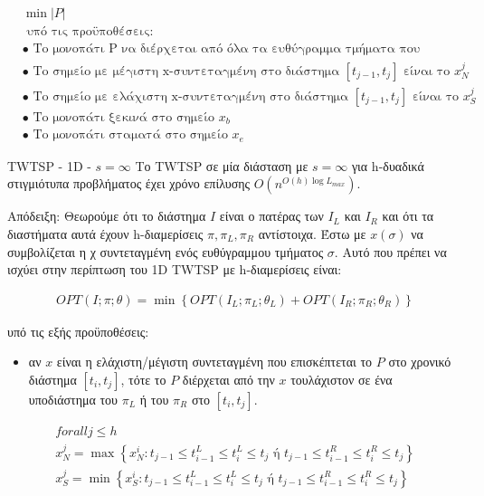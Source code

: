 \documentclass[oneside,12pt]{book}
\theoremstyle{definition}
\begin{document}
\begin{align*}
	&\min |P| \\
	&\text{ υπό τις προϋποθέσεις:} \\
	&\bullet \text{ Το μονοπάτι P να διέρχεται από όλα τα ευθύγραμμα τμήματα που βρίσκονται εντός του I} \\
	&\bullet \text{ Το σημείο με μέγιστη x-συντεταγμένη στο διάστημα } [t_{j-1}, t_j] \text{ είναι το } x^{j}_N  \\
	&\bullet \text{ Το σημείο με ελάχιστη x-συντεταγμένη στο διάστημα } [t_{j-1}, t_j] \text{ είναι το } x^{j}_S  \\
	&\bullet \text{ Το μονοπάτι ξεκινά στο σημείο } x_b \\
	&\bullet \text{ Το μονοπάτι σταματά στο σημείο } x_e
\end{align*}

\begin{mytheorem}{TWTSP - 1D - \(s = \infty\)}{}
	Το TWTSP σε μία διάσταση με \(s = \infty\) για h-δυαδικά στιγμιότυπα προβλήματος έχει χρόνο επίλυσης \(O(n^{O(h) \log L_{max}})\).
\end{mytheorem}

Απόδειξη:
Θεωρούμε ότι το διάστημα \(I\) είναι ο πατέρας των \(I_L\) και \(I_R\) και ότι τα διαστήματα αυτά έχουν h-διαμερίσεις \(π, π_L, π_R\) αντίστοιχα. Έστω με \(x(σ)\) να συμβολίζεται η χ συντεταγμένη ενός ευθύγραμμου τμήματος \(σ\). Αυτό που πρέπει να ισχύει στην περίπτωση του 1D TWTSP με h-διαμερίσεις είναι:

\begin{align*}
	OPT(I;π;θ) = \min \left\{ OPT(I_L;π_L;θ_L) + OPT(I_R;π_R;θ_R) \right\}
\end{align*}

υπό τις εξής προϋποθέσεις: \\
\begin{itemize}
	\item αν \(x\) είναι η ελάχιστη/μέγιστη συντεταγμένη που επισκέπτεται το \(P\) στο χρονικό διάστημα \([t_i, t_j]\), τότε το \(P\) διέρχεται από την \(x\) τουλάχιστον σε ένα υποδιάστημα του \(π_L\) ή του \(π_R\) στο \([t_i, t_j]\). 
\end{itemize}

\begin{align*}
	forall j \leq h \\
	x^{j}_N = \max \left\{ x^{i}_N: t_{j-1} \leq t_{i-1}^L \leq t_{i}^L \leq t_j \text{ ή } t_{j-1} \leq t_{i-1}^R \leq t_{i}^R \leq t_j \right\} \\
	x^{j}_S = \min \left\{ x^{i}_S: t_{j-1} \leq t_{i-1}^L \leq t_{i}^L \leq t_j \text{ ή } t_{j-1} \leq t_{i-1}^R \leq t_{i}^R \leq t_j \right\}
\end{align*}
\end{document}
